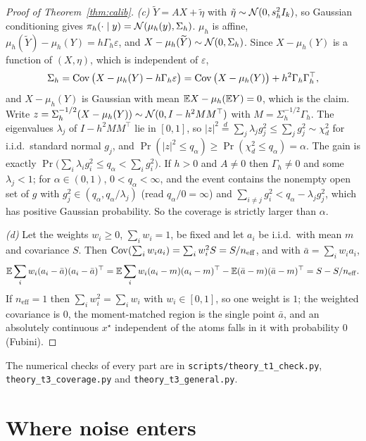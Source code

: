 \documentclass{article}
\theoremstyle{plain}
\theoremstyle{remark}
\begin{document}
\begin{proof}[Proof of Theorem~\ref{thm:calib}]
\emph{(c)} $\widetilde Y=AX+\tilde\eta$ with $\tilde\eta\sim\mathcal{N}(0,s_h^2I_k)$, so Gaussian
conditioning gives $\pi_h(\cdot\mid y)=\mathcal{N}(\mu_h(y),\Sigma_h)$. $\mu_h$ is affine,
$\mu_h(\widetilde Y)-\mu_h(Y)=h\Gamma_h\varepsilon$, and
$X-\mu_h(\widetilde Y)\sim\mathcal{N}(0,\Sigma_h)$. Since $X-\mu_h(Y)$ is a function of $(X,\eta)$,
which is independent of $\varepsilon$,
\begin{equation*}
\Sigma_h=\operatorname{Cov}\big(X-\mu_h(Y)-h\Gamma_h\varepsilon\big)=\operatorname{Cov}\big(X-\mu_h(Y)\big)+h^2\Gamma_h\Gamma_h^\top,
\end{equation*}
and $X-\mu_h(Y)$ is Gaussian with mean $\mathbb{E} X-\mu_h(\mathbb{E} Y)=0$, which is the claim. Write
$z=\Sigma_h^{-1/2}(X-\mu_h(Y))\sim\mathcal{N}(0,I-h^2MM^\top)$ with
$M=\Sigma_h^{-1/2}\Gamma_h$. The eigenvalues $\lambda_j$ of $I-h^2MM^\top$ lie in $[0,1]$, so
$|z|^2\overset{d}{=}\sum_j\lambda_jg_j^2\le\sum_jg_j^2\sim\chi^2_d$ for i.i.d.\ standard
normal $g_j$, and $\Pr(|z|^2\le q_\alpha)\ge\Pr(\chi^2_d\le q_\alpha)=\alpha$. The gain is
exactly $\Pr\big(\sum_i\lambda_ig_i^2\le q_\alpha<\sum_ig_i^2\big)$. If $h>0$ and $A\ne0$
then $\Gamma_h\ne0$ and some $\lambda_j<1$; for $\alpha\in(0,1)$, $0<q_\alpha<\infty$, and the
event contains the nonempty open set of $g$ with
$g_j^2\in(q_\alpha,q_\alpha/\lambda_j)$ (read $q_\alpha/0=\infty$) and
$\sum_{i\ne j}g_i^2<q_\alpha-\lambda_jg_j^2$, which has positive Gaussian probability. So the
coverage is strictly larger than $\alpha$.

\emph{(d)} Let the weights $w_i\ge0$, $\sum_iw_i=1$, be fixed and let $a_i$ be i.i.d.\ with
mean $m$ and covariance $S$. Then
$\operatorname{Cov}(\sum_iw_ia_i)=\sum_iw_i^2S=S/n_{\mathrm{eff}}$, and with $\bar a=\sum_iw_ia_i$,
\begin{equation*}
\mathbb{E}\sum_iw_i(a_i-\bar a)(a_i-\bar a)^\top
=\mathbb{E}\sum_iw_i(a_i-m)(a_i-m)^\top-\mathbb{E}(\bar a-m)(\bar a-m)^\top
=S-S/n_{\mathrm{eff}} .
\end{equation*}
If $n_{\mathrm{eff}}=1$ then $\sum_iw_i^2=\sum_iw_i$ with $w_i\in[0,1]$, so one weight is
$1$; the weighted covariance is $0$, the moment-matched region is the single point $\bar a$,
and an absolutely continuous $x^\star$ independent of the atoms falls in it with
probability $0$ (Fubini).
\end{proof}

The numerical checks of every part are in \texttt{scripts/theory\_t1\_check.py},
\texttt{theory\_t3\_coverage.py} and \texttt{theory\_t3\_general.py}.

\section{Where noise enters}
\label{app:interventions}
\end{document}
